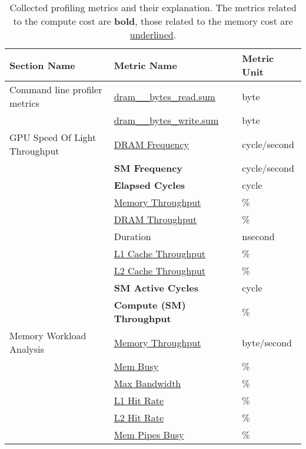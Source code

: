 \begin{table}[t]
    \begin{tabular}{lll}
        \toprule
        Section Name                  & Metric Name                          & Metric Unit  \\
        \midrule\midrule
        Command line profiler metrics & \underline{dram\_\_bytes\_read.sum}  & byte         \\
                                      & \underline{dram\_\_bytes\_write.sum} & byte         \\
        GPU Speed Of Light Throughput & \underline{DRAM Frequency}           & cycle/second \\
                                      & \textbf{SM Frequency}                & cycle/second \\
                                      & \textbf{Elapsed Cycles}              & cycle        \\
                                      & \underline{Memory Throughput}        & \%           \\
                                      & \underline{DRAM Throughput}          & \%           \\
                                      & Duration                             & nsecond      \\
                                      & \underline{L1 Cache Throughput}      & \%           \\
                                      & \underline{L2 Cache Throughput}      & \%           \\
                                      & \textbf{SM Active Cycles}            & cycle        \\
                                      & \textbf{Compute (SM) Throughput}     & \%           \\
        Memory Workload Analysis      & \underline{Memory Throughput}        & byte/second  \\
                                      & \underline{Mem Busy}                 & \%           \\
                                      & \underline{Max Bandwidth}            & \%           \\
                                      & \underline{L1 Hit Rate}              & \%           \\
                                      & \underline{L2 Hit Rate}              & \%           \\
                                      & \underline{Mem Pipes Busy}           & \%           \\
        \bottomrule
    \end{tabular}
    \caption[Collected profiling metrics and their explanation]{Collected profiling metrics and their explanation. The metrics related to the compute cost are \textbf{bold}, those related to the memory cost are \underline{underlined}.}
    \label{tab:4-profiling-metrics}
\end{table}


